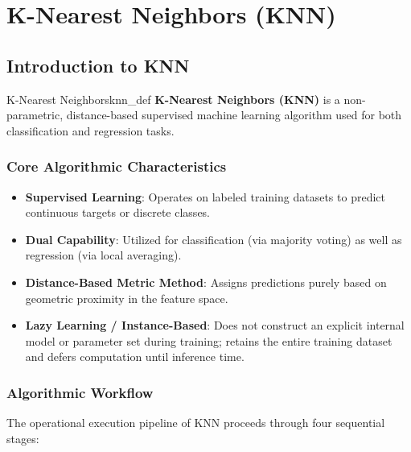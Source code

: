 \chapter{K-Nearest Neighbors (KNN)}

\section{Introduction to KNN}

\begin{definition}{K-Nearest Neighbors}{knn_def}
\textbf{K-Nearest Neighbors (KNN)} is a non-parametric, distance-based supervised machine learning algorithm used for both classification and regression tasks.
\end{definition}

\subsection{Core Algorithmic Characteristics}
\begin{itemize}[leftmargin=1.5em]
    \item \textbf{Supervised Learning}: Operates on labeled training datasets to predict continuous targets or discrete classes.
    \item \textbf{Dual Capability}: Utilized for classification (via majority voting) as well as regression (via local averaging).
    \item \textbf{Distance-Based Metric Method}: Assigns predictions purely based on geometric proximity in the feature space.
    \item \textbf{Lazy Learning / Instance-Based}: Does not construct an explicit internal model or parameter set during training; retains the entire training dataset and defers computation until inference time.
\end{itemize}

\subsection{Algorithmic Workflow}

The operational execution pipeline of KNN proceeds through four sequential stages:

